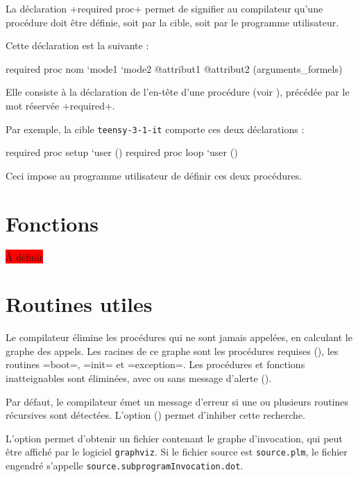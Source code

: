 
La déclaration \plm+required proc+ permet de signifier au compilateur qu'une procédure doit être définie, soit par la cible, soit par le programme utilisateur.

Cette déclaration est la suivante :
\begin{PLM}
required proc nom `mode1 `mode2 @attribut1 @attribut2 (arguments_formels)
\end{PLM}

Elle consiste à la déclaration de l'en-tête d'une procédure (voir ), précédée par le mot réservée \plm+required+.

Par exemple, la cible \texttt{teensy-3-1-it} comporte ces deux déclarations :

\begin{PLM}
required proc setup `user ()
required proc loop `user ()
\end{PLM}

Ceci impose au programme utilisateur de définir ces deux procédures.









\section{Fonctions}

\colorbox{red}{À définir}







\section{Routines utiles}

Le compilateur élimine les procédures qui ne sont jamais appelées, en calculant le graphe des appels. Les racines de ce graphe sont les procédures requises (), les routines \plm=boot=, \plm=init= et \plm=exception=. Les procédures et fonctions inatteignables sont éliminées, avec ou sans message d'alerte ().












Par défaut, le compilateur émet un message d'erreur si une ou plusieurs routines récursives sont détectées. L'option  () permet d'inhiber cette recherche.

L'option  permet d'obtenir un fichier contenant le graphe d'invocation, qui peut être affiché par le logiciel \texttt{graphviz}. Si le fichier source est \texttt{source.plm}, le fichier engendré s'appelle \texttt{source.subprogramInvocation.dot}.

